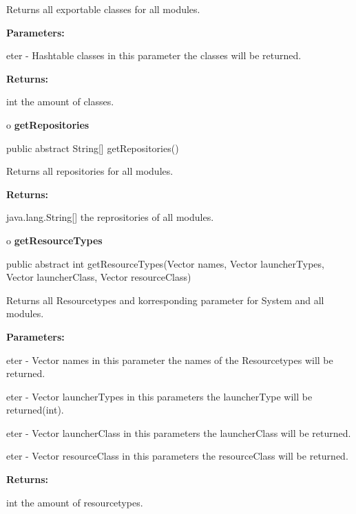 \begin{description}
\htmlDD Returns all exportable classes for all modules. 

\begin{description}
\item {\bf Parameters:}  

eter - Hashtable classes in this parameter the classes will be returned.  
\item {\bf Returns:}  

int the amount of classes.  
\end{description}

\end{description}

o {\bf getRepositories} 

\begin{PRE}
 public abstract String[] getRepositories()
\end{PRE}

\begin{description}
\htmlDD Returns all repositories for all modules. 

\begin{description}
\item {\bf Returns:}  

java.lang.String[] the reprositories of all modules.  
\end{description}

\end{description}

o {\bf getResourceTypes} 

\begin{PRE}
 public abstract int getResourceTypes(Vector names,
                                      Vector launcherTypes,
                                      Vector launcherClass,
                                      Vector resourceClass)
\end{PRE}

\begin{description}
\htmlDD Returns all Resourcetypes and korresponding parameter for System and
all modules. 

\begin{description}
\item {\bf Parameters:}  

eter - Vector names in this parameter the names of the Resourcetypes will be
returned.  

eter - Vector launcherTypes in this parameters the launcherType will be
returned(int).  

eter - Vector launcherClass in this parameters the launcherClass will be
returned.  

eter - Vector resourceClass in this parameters the resourceClass will be
returned.  
\item {\bf Returns:}  

int the amount of resourcetypes.  
\end{description}

\end{description}

